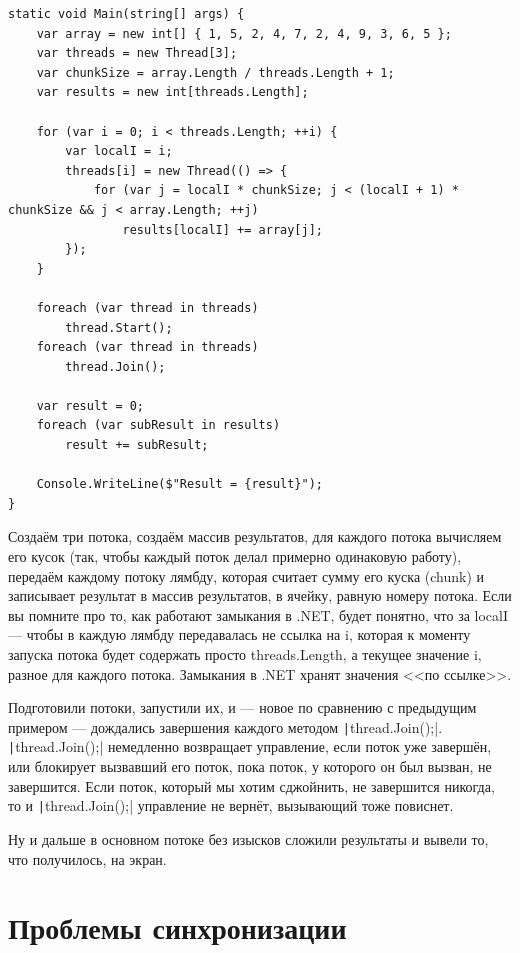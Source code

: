 \documentclass[a5paper]{article}
\begin{document}
\begin{small}
    \begin{verbatim}
static void Main(string[] args) {
    var array = new int[] { 1, 5, 2, 4, 7, 2, 4, 9, 3, 6, 5 };
    var threads = new Thread[3];
    var chunkSize = array.Length / threads.Length + 1;
    var results = new int[threads.Length];

    for (var i = 0; i < threads.Length; ++i) {
        var localI = i;
        threads[i] = new Thread(() => {
            for (var j = localI * chunkSize; j < (localI + 1) * chunkSize && j < array.Length; ++j)
                results[localI] += array[j];
        });
    }

    foreach (var thread in threads)
        thread.Start();
    foreach (var thread in threads)
        thread.Join();

    var result = 0;
    foreach (var subResult in results)
        result += subResult;

    Console.WriteLine($"Result = {result}");
}
    \end{verbatim}
\end{small}

Создаём три потока, создаём массив результатов, для каждого потока вычисляем его кусок (так, чтобы каждый поток делал примерно одинаковую работу), передаём каждому потоку лямбду, которая считает сумму его куска (chunk) и записывает результат в массив результатов, в ячейку, равную номеру потока. Если вы помните про то, как работают замыкания в .NET, будет понятно, что за localI --- чтобы в каждую лямбду передавалась не ссылка на i, которая к моменту запуска потока будет содержать просто threads.Length, а текущее значение i, разное для каждого потока. Замыкания в .NET хранят значения <<по ссылке>>.

Подготовили потоки, запустили их, и --- новое по сравнению с предыдущим примером --- дождались завершения каждого методом \texttt|thread.Join();|. \texttt|thread.Join();| немедленно возвращает управление, если поток уже завершён, или блокирует вызвавший его поток, пока поток, у которого он был вызван, не завершится. Если поток, который мы хотим сджойнить, не завершится никогда, то и \texttt|thread.Join();| управление не вернёт, вызывающий тоже повиснет.

Ну и дальше в основном потоке без изысков сложили результаты и вывели то, что получилось, на экран.

\section{Проблемы синхронизации}
\end{document}
